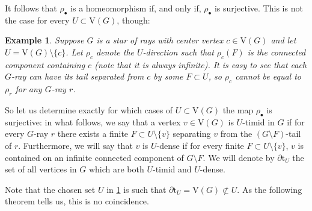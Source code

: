 \documentclass[10pt]{article}
\newcommand{\myref}[1]{\hyperref[#1]{\namecref{#1} \ref{#1}}}
\numberwithin{equation}{subsection}
\newtheorem{example}[equation]{Example}
\theoremstyle{remark}
\begin{document}
It follows that $\rho_\bullet$ is a homeomorphism if, and only if, $\rho_\bullet$ is surjective. This is not the case for every $U\subset \mathrm{V}(G)$, though: 

\begin{example}\label{EX_rhobullNotSurj}
    Suppose $G$ is a star of rays with center vertex $c\in \mathrm
    V(G)$ and let $U = \mathrm V(G)\setminus \{c\}$. Let $\rho_c$ denote the $U$-direction such that $\rho_c(F)$ is the connected component containing $c$ (note that it is always infinite). It is easy to see that each $G$-ray can have its tail separated from $c$ by some $F\subset U$, so $\rho_c$ cannot be equal to $\rho_r$ for any $G$-ray $r$.
\end{example}

So let us determine exactly for which cases of $U\subset \mathrm{V}(G)$ the map $\rho_\bullet$ is surjective: in what follows, we say that a vertex $v\in \mathrm{V}(G)$ is $U$-timid in $G$ if for every $G$-ray $r$ there exists a finite $F\subset U\setminus \{v\}$  separating $v$ from the $(G\setminus F)$-tail of $r$. Furthermore, we will say that $v$ is $U$-dense if for every finite $F\subset U\setminus\{v\}$, $v$ is contained on an infinite connected component of $G\setminus F$. We will denote by $\partial \mathrm{t}_U$ the set of all vertices in $G$ which are both $U$-timid and $U$-dense. 

Note that the chosen set $U$ in \myref{EX_rhobullNotSurj} is such that $\partial\mathrm t_U = \mathrm
V(G) \not\subset U$. As the following theorem tells us, this is no coincidence.
\end{document}
